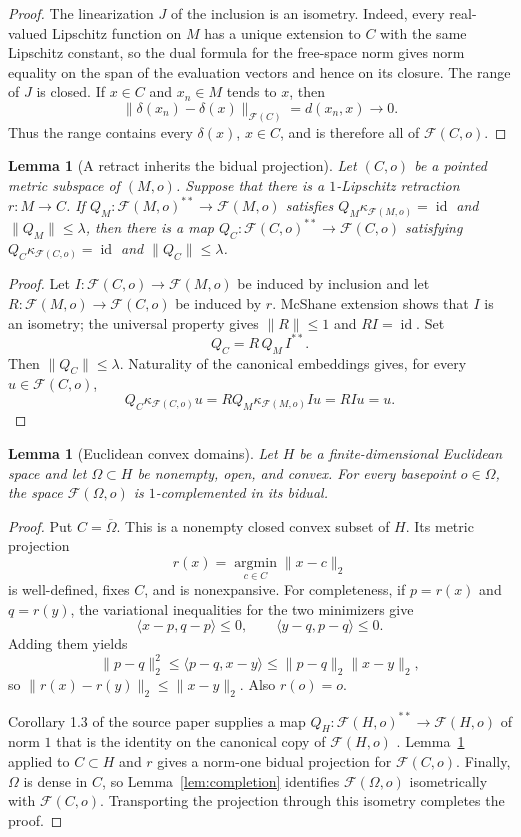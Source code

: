 \documentclass[11pt]{article}
\newtheorem{lemma}[theorem]{Lemma}
\newcommand{\F}{\mathcal F}
\newcommand{\id}{\operatorname{id}}
\begin{document}
\begin{proof}
The linearization $J$ of the inclusion is an isometry.  Indeed, every
real-valued Lipschitz function on $M$ has a unique extension to $C$ with the
same Lipschitz constant, so the dual formula for the free-space norm gives
norm equality on the span of the evaluation vectors and hence on its
closure.  The range of $J$ is closed.  If $x\in C$ and $x_n\in M$ tends to
$x$, then
\[
 \|\delta(x_n)-\delta(x)\|_{\F(C)}=d(x_n,x)\longrightarrow 0.
\]
Thus the range contains every $\delta(x)$, $x\in C$, and is therefore all of
$\F(C,o)$.
\end{proof}

\begin{lemma}[A retract inherits the bidual projection]\label{lem:retract}
Let $(C,o)$ be a pointed metric subspace of $(M,o)$.  Suppose that there is a
$1$-Lipschitz retraction $r:M\to C$.  If
$Q_M:\F(M,o)^{**}\to\F(M,o)$ satisfies
$Q_M\kappa_{\F(M,o)}=\id$ and $\|Q_M\|\leq\lambda$, then there is a map
$Q_C:\F(C,o)^{**}\to\F(C,o)$ satisfying
$Q_C\kappa_{\F(C,o)}=\id$ and $\|Q_C\|\leq\lambda$.
\end{lemma}

\begin{proof}
Let $I:\F(C,o)\to\F(M,o)$ be induced by inclusion and let
$R:\F(M,o)\to\F(C,o)$ be induced by $r$.  McShane extension shows that $I$
is an isometry; the universal property gives $\|R\|\leq1$ and $RI=\id$.
Set
\[
 Q_C=R\,Q_M\,I^{**}.
\]
Then $\|Q_C\|\leq\lambda$.  Naturality of the canonical embeddings gives,
for every $u\in\F(C,o)$,
\[
 Q_C\kappa_{\F(C,o)}u
 =R Q_M\kappa_{\F(M,o)}Iu=RIu=u.
\]
\end{proof}

\begin{lemma}[Euclidean convex domains]\label{lem:euclidean}
Let $H$ be a finite-dimensional Euclidean space and let
$\Omega\subset H$ be nonempty, open, and convex.  For every basepoint
$o\in\Omega$, the space $\F(\Omega,o)$ is $1$-complemented in its bidual.
\end{lemma}

\begin{proof}
Put $C=\overline\Omega$.  This is a nonempty closed convex subset of $H$.
Its metric projection
\[
 r(x)=\operatorname*{argmin}_{c\in C}\|x-c\|_2
\]
is well-defined, fixes $C$, and is nonexpansive.  For completeness, if
$p=r(x)$ and $q=r(y)$, the variational inequalities for the two minimizers
give
\[
 \langle x-p,q-p\rangle\leq0,\qquad
 \langle y-q,p-q\rangle\leq0.
\]
Adding them yields
\[
 \|p-q\|_2^2\leq\langle p-q,x-y\rangle
 \leq\|p-q\|_2\|x-y\|_2,
\]
so $\|r(x)-r(y)\|_2\leq\|x-y\|_2$.  Also $r(o)=o$.

Corollary 1.3 of the source paper supplies a map
$Q_H:\F(H,o)^{**}\to\F(H,o)$ of norm $1$ that is the identity on the
canonical copy of $\F(H,o)$ \cite{CKK}.  Lemma~\ref{lem:retract} applied to
$C\subset H$ and $r$ gives a norm-one bidual projection for $\F(C,o)$.
Finally, $\Omega$ is dense in $C$, so Lemma~\ref{lem:completion} identifies
$\F(\Omega,o)$ isometrically with $\F(C,o)$.  Transporting the projection
through this isometry completes the proof.
\end{proof}
\end{document}
